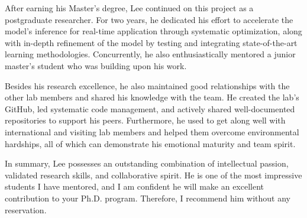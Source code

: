 After earning his Master's degree, Lee continued on this project as a postgraduate researcher.
For two years, he dedicated his effort to accelerate the model's inference for real-time application through systematic optimization, along with in-depth refinement of the model by testing and integrating state-of-the-art learning methodologies. 
Concurrently, he also enthusiastically mentored a junior master's student who was building upon his work.



Besides his research excellence, he also maintained good relationships with the other lab members and shared his knowledge with the team. He created the lab's GitHub, led systematic code management, and actively shared well-documented repositories to support his peers. Furthermore, he used to get along well with international and visiting lab members and helped them overcome environmental hardships, all of which can demonstrate his emotional maturity and team spirit.

In summary, Lee possesses an outstanding combination of intellectual passion, validated research skills, and collaborative spirit. He is one of the most impressive students I have mentored, and I am confident he will make an excellent contribution to your Ph.D. program. Therefore, I recommend him without any reservation.